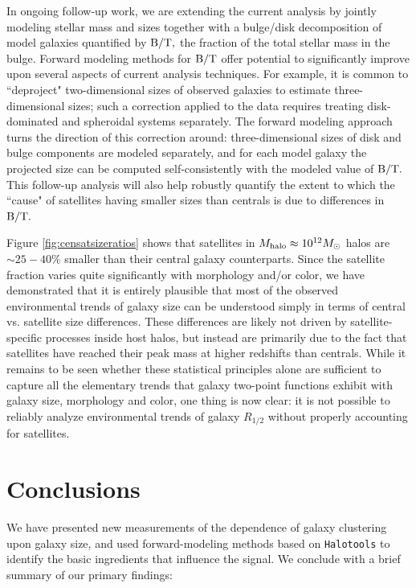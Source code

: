\documentclass[usenatbib,usegraphicx,letterpaper]{mn2e}
\newcommand{\rhalf}{R_{1/2}}
\newcommand{\mhalo}{M_{\rm halo}}
\newcommand{\msun}{M_\odot}
\begin{document}
In ongoing follow-up work, we are extending the current analysis by jointly modeling stellar mass and sizes together with a bulge/disk decomposition of model galaxies quantified by ${\rm B/T},$ the fraction of the total stellar mass in the bulge. Forward modeling methods for ${\rm B/T}$ offer potential to significantly improve upon several aspects of current analysis techniques. For example, it is common to ``deproject" two-dimensional sizes of observed galaxies to estimate three-dimensional sizes; such a correction applied to the data requires treating disk-dominated and spheroidal systems separately. The forward modeling approach turns the direction of this correction around: three-dimensional sizes of disk and bulge components are modeled separately, and for each model galaxy the projected size can be computed self-consistently with the modeled value of ${\rm B/T}.$ This follow-up analysis will also help robustly quantify the extent to which the ``cause" of satellites having smaller sizes than centrals is due to differences in ${\rm B/T}.$ 

Figure \ref{fig:censatsizeratios} shows that satellites in $\mhalo\approx10^{12}\msun$ halos are $\sim25-40\%$ smaller than their central galaxy counterparts. Since the satellite fraction varies quite significantly with morphology and/or color, we have demonstrated that it is entirely plausible that most of the observed environmental trends of galaxy size can be understood simply in terms of central vs. satellite size differences. These differences are likely not driven by satellite-specific processes inside host halos, but instead are primarily due to the fact that satellites have reached their peak mass at higher redshifts than centrals. While it remains to be seen whether these statistical principles alone are sufficient to capture all the elementary trends that galaxy two-point functions exhibit with galaxy size, morphology and color, one thing is now clear: it is not possible to reliably analyze environmental trends of galaxy $\rhalf$ without properly accounting for satellites.



\section{Conclusions}
\label{sec:conclusion}

We have presented new measurements of the dependence of galaxy clustering upon galaxy size, and used forward-modeling methods based on {\tt Halotools} to identify the basic ingredients that influence the signal. We conclude with a brief summary of our primary findings:
\end{document}
